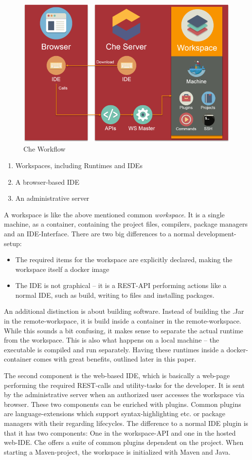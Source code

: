 \documentclass[english,utf8]{lni}
\begin{document}
\begin{figure}[h]
	\centering
	\includegraphics[width=0.7\linewidth]{imgs/Che_Workflow}
	\caption[Che Workflow]{Che Workflow}
	\label{fig:cheworkflow}
\end{figure}
\newpage

\begin{enumerate}
	\item Workspaces, including Runtimes and IDEs
	\item A browser-based IDE
	\item An administrative server
\end{enumerate}
A workspace is like the above mentioned common \textit{workspace}. 
It is a single machine, as a container, containing the project files, compilers, package managers and an IDE-Interface. 
There are two big differences to a normal development-setup:
\begin{itemize}
	\item The required items for the workspace are explicitly  declared, making  the  workspace itself a docker image
	\item The IDE is not graphical – it is a REST-API performing actions like a normal IDE, such as build, writing to files and installing packages.  
\end{itemize}
An additional distinction is about building software.
Instead of building the .Jar in the remote-workspace, it is build inside a container in the remote-workspace.
While this sounds a bit confusing, it makes sense to separate the actual runtime from the workspace. 
This is also what happens on a local machine – the executable is compiled and run separately. 
Having these runtimes inside a docker-container comes with great benefits, outlined later in this paper.

The second component is the web-based IDE, which is basically a web-page performing the required REST-calls and utility-tasks for the developer. 
It is sent by the administrative server when an authorized user accesses the workspace via browser. 
These two components can be enriched with plugins.  
Common plugins are language-extensions which support syntax-highlighting etc. or package managers with their regarding lifecycles.
The difference to a normal IDE plugin is that it has two components: 
One in the workspace-API and one in the hosted web-IDE.  
Che offers a suite of common plugins dependent on the project. 
When starting a Maven-project, the workspace is initialized with Maven and Java.
\end{document}
